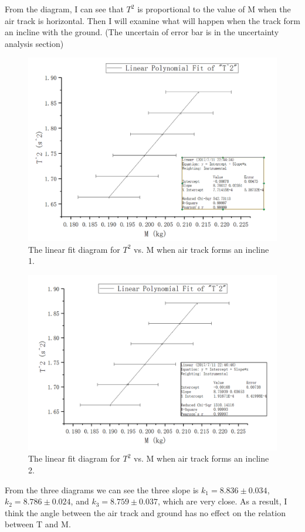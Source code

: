 \documentclass[12pt]{article}
\begin{document}
From the diagram, I can see that $T^2$ is proportional to the value of M when the air track is horizontal. Then I will examine what will happen when the track form an incline with the ground. (The uncertain of error bar is in the uncertainty analysis section)
\begin{figure}[H]
\centering
\includegraphics[scale=0.4]{P9.jpg}
\caption{The linear fit diagram for $T^2$ vs. M when air track forms an incline 1.}
\end{figure}
\begin{figure}[H]
\centering
\includegraphics[scale=0.4]{P10.jpg}
\caption{The linear fit diagram for $T^2$ vs. M when air track forms an incline 2.}
\end{figure}
From the three diagrams we can see the three slope is $k_1=8.836\pm0.034$, $k_2=8.786\pm0.024$, and $k_3=8.759\pm0.037$, which are very close. As a result, I think the angle between the air track and ground has no effect on the relation between T and M.
\end{document}
